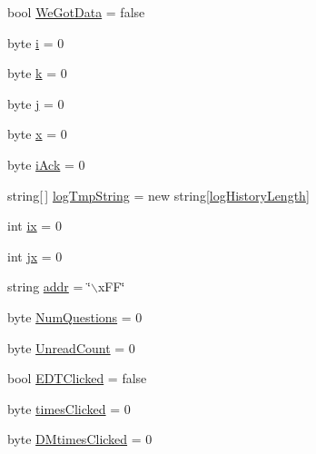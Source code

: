 \begin{DoxyCompactItemize}
\item 
bool \hyperlink{class_sr_p___classroom_inq_1_1frm_classrrom_inq_a44eb31e84ef4705e39c15c4d6047807e}{\-We\-Got\-Data} = false
\item 
byte \hyperlink{class_sr_p___classroom_inq_1_1frm_classrrom_inq_aa757c37b373c81fd9ac14b89ad217df0}{i} = 0
\item 
byte \hyperlink{class_sr_p___classroom_inq_1_1frm_classrrom_inq_ad13cb123edd99d95b379613aad0f2a39}{k} = 0
\item 
byte \hyperlink{class_sr_p___classroom_inq_1_1frm_classrrom_inq_a2eb87c50d0e2c90c1256a6e26cc8a651}{j} = 0
\item 
byte \hyperlink{class_sr_p___classroom_inq_1_1frm_classrrom_inq_ab6836b7a465c2251301a02d9da5c3c31}{x} = 0
\item 
byte \hyperlink{class_sr_p___classroom_inq_1_1frm_classrrom_inq_a3eefb413ee1ce6cd615c0d1af7cee8d3}{i\-Ack} = 0
\item 
string\mbox{[}$\,$\mbox{]} \hyperlink{class_sr_p___classroom_inq_1_1frm_classrrom_inq_acf11c4997f1ad160ca28e4d7b1489f08}{log\-Tmp\-String} = new string\mbox{[}\hyperlink{class_sr_p___classroom_inq_1_1frm_classrrom_inq_a0b55eb955abb243808249457ac92ca93}{log\-History\-Length}\mbox{]}
\item 
int \hyperlink{class_sr_p___classroom_inq_1_1frm_classrrom_inq_a1f5209850965916fddf21b2409e6204a}{ix} = 0
\item 
int \hyperlink{class_sr_p___classroom_inq_1_1frm_classrrom_inq_a6206484c9b4d5d7558f8904cad77cded}{jx} = 0
\item 
string \hyperlink{class_sr_p___classroom_inq_1_1frm_classrrom_inq_ab99245163109493292f36ab5011c4f76}{addr} = \char`\"{}$\backslash$x\-F\-F\char`\"{}
\item 
byte \hyperlink{class_sr_p___classroom_inq_1_1frm_classrrom_inq_a7e4d497088afdd32623b3b54749210a0}{\-Num\-Questions} = 0
\item 
byte \hyperlink{class_sr_p___classroom_inq_1_1frm_classrrom_inq_a9978aff45fb1057f102e224f8485f096}{\-Unread\-Count} = 0
\item 
bool \hyperlink{class_sr_p___classroom_inq_1_1frm_classrrom_inq_a2f126b875f216c20427f6818976a9465}{\-E\-D\-T\-Clicked} = false
\item 
byte \hyperlink{class_sr_p___classroom_inq_1_1frm_classrrom_inq_a8b01f872cc35c75e41502f5114a65b74}{times\-Clicked} = 0
\item 
byte \hyperlink{class_sr_p___classroom_inq_1_1frm_classrrom_inq_a595a5c6942aa919d47de2b3e20f5f5bc}{\-D\-Mtimes\-Clicked} = 0

\end{DoxyCompactItemize}
